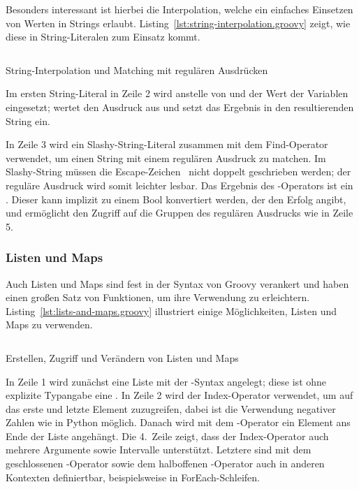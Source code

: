 \documentclass[a4paper]{article}
\newcommand{\codelisting}[3]{\begin{listing}[htp]
	\inputminted{#1}{#1/#2}
	\vspace{-3ex}
	\caption{#3}
	\label{lst:#2}
\end{listing}}
\begin{document}
Besonders interessant ist hierbei die Interpolation, welche ein einfaches Einsetzen von Werten in Strings erlaubt.
Listing~\ref{lst:string-interpolation.groovy} zeigt, wie diese in String-Literalen zum Einsatz kommt.

\codelisting{groovy}{string-interpolation.groovy}{String-Interpolation und Matching mit regulären Ausdrücken}

Im ersten String-Literal in Zeile 2 wird anstelle von  und  der Wert der Variablen eingesetzt;
 wertet den Ausdruck  aus und setzt das Ergebnis in den resultierenden String ein.

In Zeile 3 wird ein Slashy-String-Literal zusammen mit dem Find-Operator \code{=~} verwendet, um einen String mit einem regulären Ausdruck zu matchen.
Im Slashy-String müssen die Escape-Zeichen~\plain{\ } nicht doppelt geschrieben werden; der reguläre Ausdruck wird somit leichter lesbar.
Das Ergebnis des \code{=~}-Operators ist ein .
Dieser kann implizit zu einem Bool konvertiert werden, der den Erfolg angibt, und ermöglicht den Zugriff auf die Gruppen des regulären Ausdrucks wie in Zeile 5.

\subsubsection{Listen und Maps}\label{subsubsec:listen-und-maps}

Auch Listen und Maps sind fest in der Syntax von Groovy verankert und haben einen großen Satz von Funktionen, um ihre Verwendung zu erleichtern.
Listing~\ref{lst:lists-and-maps.groovy} illustriert einige Möglichkeiten, Listen und Maps zu verwenden.

\codelisting{groovy}{lists-and-maps.groovy}{Erstellen, Zugriff und Verändern von Listen und Maps}

In Zeile 1 wird zunächst eine Liste mit der \code{[]}-Syntax angelegt;
diese ist ohne explizite Typangabe eine .
In Zeile 2 wird der Index-Operator verwendet, um auf das erste und letzte Element zuzugreifen, dabei ist die Verwendung negativer Zahlen wie in Python möglich.
Danach wird mit dem \code{<<}-Operator ein Element ans Ende der Liste angehängt.
Die 4.~Zeile zeigt, dass der Index-Operator auch mehrere Argumente sowie Intervalle unterstützt.
Letztere sind mit dem geschlossenen -Operator sowie dem halboffenen -Operator auch in anderen Kontexten definiertbar, beispielsweise in ForEach-Schleifen.
\end{document}
